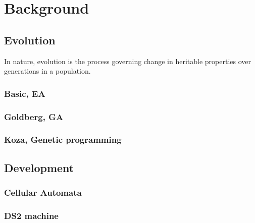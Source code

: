 
\chapter{Background}


\section{Evolution}

In nature, evolution is the process governing change in heritable properties
over generations in a population.

\subsection{Basic, EA}

\subsection{Goldberg, GA}

\subsection{Koza, Genetic programming}

\section{Development}

\subsection{Cellular Automata}

\subsection{DS2 machine}

